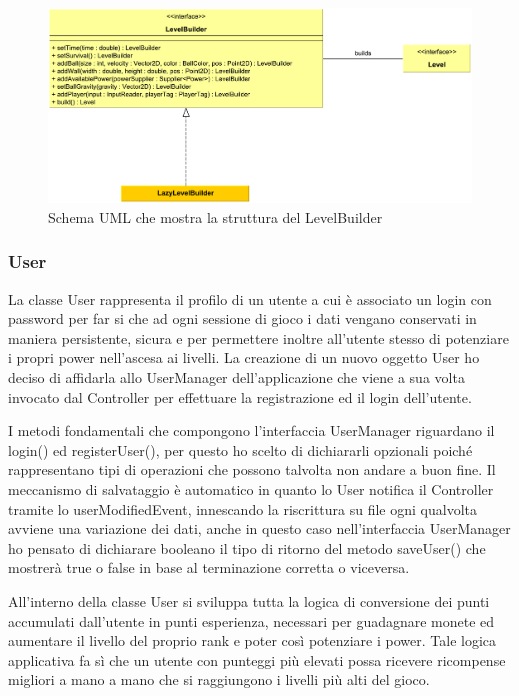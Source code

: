 \documentclass[a4paper,12pt]{report}
\begin{document}
\begin{figure}[H]
\includegraphics[width=\linewidth]{img/levelbuilder}
\caption{Schema UML che mostra la struttura del LevelBuilder}
\label{img:decorator}
\end{figure}

\subsubsection*{User}
La classe User rappresenta il profilo di un utente a cui è associato un login con password per far si che ad ogni sessione di gioco i dati vengano conservati in maniera persistente, sicura e per permettere inoltre all'utente stesso di potenziare i propri power nell'ascesa ai livelli.
La creazione di un nuovo oggetto User ho deciso di affidarla allo UserManager dell'applicazione che viene a sua volta invocato dal Controller per effettuare la registrazione ed il login dell'utente.

I metodi fondamentali che compongono l'interfaccia UserManager riguardano il login() ed registerUser(), per questo ho scelto di dichiararli opzionali poiché rappresentano tipi di operazioni che possono talvolta non andare a buon fine. 
Il meccanismo di salvataggio è automatico in quanto lo User notifica il Controller tramite lo userModifiedEvent, innescando la riscrittura su file ogni qualvolta avviene una variazione dei dati, anche in questo caso nell'interfaccia UserManager ho pensato di dichiarare booleano il tipo di ritorno del metodo saveUser() che mostrerà true o false in base al terminazione corretta o viceversa.

All'interno della classe User si sviluppa tutta la logica di conversione dei punti accumulati dall'utente in punti esperienza, necessari per guadagnare monete ed aumentare il livello del proprio rank e poter così potenziare i power. Tale logica applicativa fa sì che un utente con punteggi più elevati possa ricevere ricompense migliori a mano a mano che si raggiungono i livelli più alti del gioco.
\end{document}
